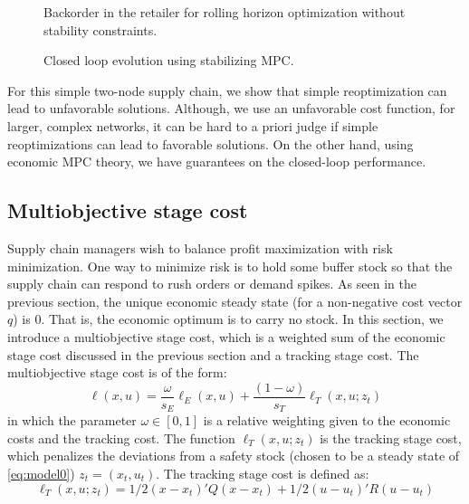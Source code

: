 \documentclass{elsarticle}
\theoremstyle{definition}
\begin{document}
\begin{figure}
\centering
\small
{\resizebox{\textwidth}{!}{}}
\caption{Backorder in the retailer for rolling horizon optimization
  without stability constraints.}
\label{fig:esc:unstable_SC}
\end{figure}

\begin{figure}
\centering
\scriptsize
{\resizebox{\textwidth}{!}{}}
\caption{Closed loop evolution using stabilizing MPC.}
\label{fig:esc:stable_SC}
\end{figure}

For this simple two-node supply chain, we show that simple
reoptimization can lead to unfavorable solutions. Although, we use an
unfavorable cost function, for larger, complex networks, it can be
hard to a priori judge if simple reoptimizations can lead to favorable
solutions. On the other hand, using economic MPC theory, we have
guarantees on the closed-loop performance. 

\subsection{Multiobjective stage cost}
\label{sec:multiobj}
Supply chain managers wish to balance profit maximization with 
risk minimization. One way to minimize risk is to hold some buffer
stock so that the supply chain can respond to rush orders or demand
spikes. As seen in the previous section, the unique economic steady
state (for a non-negative cost vector $q$) is ${0}$. That
is, the economic optimum is to carry no stock. In this section, we
introduce a multiobjective stage cost, which is a weighted sum of the
economic stage cost discussed in the previous section and a tracking
stage cost. The multiobjective stage cost is of the form:
\begin{equation}
\label{eq:esc:ell}
\ell(x,u) = \frac{\omega}{s_E} \ell_E(x,u) + \frac{(1-\omega)}{s_T} \ell_T(x,u;z_t)
\end{equation}
in which the parameter $\omega \in [0,1]$ is a relative weighting
given to the economic costs and the tracking cost. The function
$\ell_T(x,u;z_t)$ is the tracking stage cost, which penalizes the
deviations from a safety stock (chosen to be a steady state of
\eqref{eq:model0}) $z_t = (x_t,u_t)$. The tracking stage cost
is defined as:
\begin{equation}
\label{eq:esc:ellT}
\ell_T(x,u;z_t) = 1/2(x-x_t)'Q(x-x_t)+ 1/2(u-u_t)'R(u-u_t)
\end{equation} 
\end{document}
